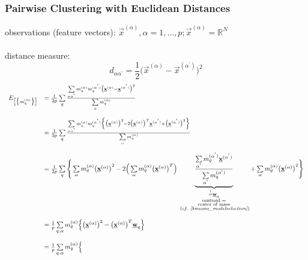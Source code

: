 \subsubsection{Pairwise Clustering with Euclidean Distances}
\label{sec:pairwiseEuclidean}
observations (feature vectors): $\vec{x}^{(\alpha)}, \alpha = 1, \ldots, p; \vec{x}^{(\alpha)} = \mathbb{R}^N$ 
\\\\
distance measure:
\begin{equation}
	d_{\alpha \alpha^{'}} = \frac{1}{2} \big( \vec{x}^{(\alpha)} 
		- \vec{x}^{(\alpha^{'})} \big)^2
\end{equation}
\begin{equation}
	\begin{array}{ll}
	E_{\big[ \big\{ m_q^{(\alpha)} \big\} \big]}
	& = \frac{1}{2p} \sum\limits_q \frac{ \sum\limits_{\alpha \alpha^{'}}
		m_q^{(\alpha)} m_q^{(\alpha^{'})} \big( \underline{\mathbf{x}}^{(\alpha)}
		-\underline{\mathbf{x}}^{(\alpha^{'})} \big)^2 }{
			\sum\limits_{\alpha} m_q^{(\alpha)}} \\\\
	& = \frac{1}{2p} \sum\limits_q \frac{ \sum\limits_{\alpha \alpha^{'}}
		m_q^{(\alpha)} m_q^{(\alpha^{'})} \Big\{ \big( 
		\underline{\mathbf{x}}^{(\alpha)} \big)^2 - 2\big( \underline{\mathbf{x}}^{(\alpha)} \big)^T
		\underline{\mathbf{x}}^{(\alpha^{'})} + \big( \underline{\mathbf{x}}^{(\alpha^{'})} \big)^2
		\Big\} }{ \sum\limits_{\alpha} m_q^{(\alpha)} } \\\\
	& = \frac{1}{2p} \sum\limits_q \Bigg\{ \sum\limits_{\alpha}
		m_q^{(\alpha)} \big( \underline{\mathbf{x}}^{(\alpha)} \big)^2 
		- 2 \Big( \sum\limits_{\alpha} m_q^{(\alpha)} \big( 
		\underline{\mathbf{x}}^{(\alpha)} \big)^T \Big) 
		\underbrace{ \frac{ \sum\limits_{\alpha^{'}} m_q^{(\alpha^{'})} 
		\underline{\mathbf{x}}^{(\alpha^{'})} }{ \sum\limits_{\alpha^{'}} 
		m_q^{(\alpha^{'})} } }_{
			\substack{ \stackrel{\mathrm{!}}{=} \underline{\mathbf{w}}_q \\
				\substack{\text{centroid =} \\ 
                                  \text{center of mass}\\ \text{ ({\it cf. \ref{kmeans_modelselection}})}}} }
		+ \sum\limits_{\alpha} m_q^{(\alpha)} \big( \underline{\mathbf{x}}^{(\alpha)}
			\big)^2 \Bigg\} \\\\
	& = \frac{1}{p} \sum\limits_{q, \alpha} m_q^{(\alpha)} \Big\{
		\big( \underline{\mathbf{x}}^{(\alpha)} \big)^2 - \big( \underline{\mathbf{x}}^{(\alpha)}
		\big)^T \underline{\mathbf{w}}_q \Big\} \\\\
	& = \frac{1}{p} \sum\limits_{q, \alpha} m_q^{(\alpha)} \Big\{

\end{array}
\end{equation}
